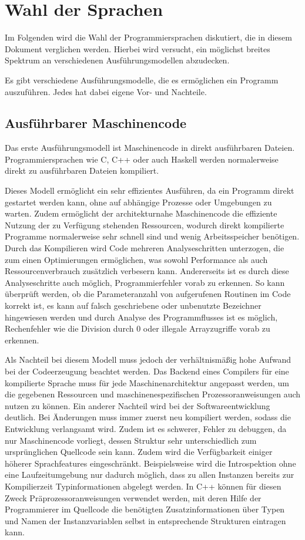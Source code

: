 \documentclass[11pt, parskip=half]{scrartcl}       %
\begin{document}
\section{Wahl der Sprachen}

Im Folgenden wird die Wahl der Programmiersprachen diskutiert, die in diesem Dokument verglichen werden.
Hierbei wird versucht, ein möglichst breites Spektrum an verschiedenen Ausführungsmodellen abzudecken.

Es gibt verschiedene Ausführungsmodelle, die es ermöglichen ein Programm auszuführen. Jedes hat dabei eigene Vor- und Nachteile.

\subsection{Ausführbarer Maschinencode}

Das erste Ausführungsmodell ist Maschinencode in direkt ausführbaren Dateien.
Programmiersprachen wie C, C++ oder auch Haskell werden normalerweise direkt zu ausführbaren Dateien kompiliert.

Dieses Modell ermöglicht ein sehr effizientes Ausführen, da ein Programm direkt gestartet werden kann, ohne auf abhängige Prozesse oder Umgebungen zu warten.
Zudem ermöglicht der architekturnahe Maschinencode die effiziente Nutzung der zu Verfügung stehenden Ressourcen, wodurch direkt kompilierte Programme normalerweise sehr schnell sind und wenig Arbeitsspeicher benötigen.
Durch das Kompilieren wird Code mehreren Analyseschritten unterzogen, die zum einen Optimierungen ermöglichen, was sowohl Performance als auch Ressourcenverbrauch zusätzlich verbesern kann.
Andererseits ist es durch diese Analyseschritte auch möglich, Programmierfehler vorab zu erkennen.
So kann überprüft werden, ob die Parameteranzahl von aufgerufenen Routinen im Code korrekt ist, es kann auf falsch geschriebene oder unbenutzte Bezeichner hingewiesen werden und durch Analyse des Programmflusses ist es möglich, Rechenfehler wie die Division durch 0 oder illegale Arrayzugriffe vorab zu erkennen.


Als Nachteil bei diesem Modell muss jedoch der verhältnismäßig hohe Aufwand bei der Codeerzeugung beachtet werden.
Das Backend eines Compilers für eine kompilierte Sprache muss für jede Maschinenarchitektur angepasst werden, um die gegebenen Ressourcen und maschinenespezifischen Prozessoranweisungen auch nutzen zu können.
Ein anderer Nachteil wird bei der Softwareentwicklung deutlich.
Bei Änderungen muss immer zuerst neu kompiliert werden, sodass die Entwicklung verlangsamt wird.
Zudem ist es schwerer, Fehler zu debuggen, da nur Maschinencode vorliegt, dessen Struktur sehr unterschiedlich zum ursprünglichen Quellcode sein kann.
Zudem wird die Verfügbarkeit einiger höherer Sprachfeatures eingeschränkt.
Beispielsweise wird die Introspektion ohne eine Laufzeitumgebung nur dadurch möglich, dass zu allen Instanzen bereits zur Kompilierzeit Typinformationen abgelegt werden.
In C++ können für diesen Zweck Präprozessoranweisungen verwendet werden, mit deren Hilfe der Programmierer im Quellcode die benötigten Zusatzinformationen über Typen und Namen der Instanzvariablen selbst in entsprechende Strukturen eintragen kann.
\end{document}
